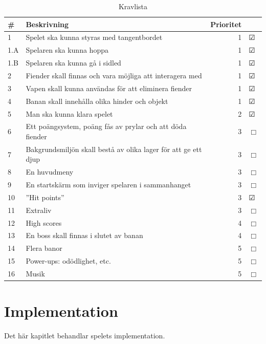 \documentclass{scrartcl}
\begin{document}
\begin{table}[ht]
	\caption{Kravlista}\label{kravlista}
	\centering
	\begin{tabular}{lp{8cm}rl}
	\toprule
		\# & Beskrivning & Prioritet &  \\
	\midrule
	1 & Spelet ska kunna styras med tangentbordet &
		1 & $\CheckedBox$ \\
	1.A & Spelaren ska kunna hoppa &
		1 & $\CheckedBox$ \\
	1.B & Spelaren ska kunna gå i sidled &
		1 & $\CheckedBox$ \\
	2 & Fiender skall finnas och vara möjliga att interagera med &
		1 & $\CheckedBox$ \\
	3 & Vapen skall kunna användas för att eliminera fiender &
		1 & $\CheckedBox$ \\
	4 & Banan skall innehålla olika hinder och objekt  &
		1 & $\CheckedBox$ \\
	5 & Man ska kunna klara spelet &
		2 & $\CheckedBox$ \\
	6 & Ett poängsystem, poäng fås av prylar och att döda fiender &
		3 & $\Box$ \\
	7 & Bakgrundsmiljön skall bestå av olika lager för att ge ett djup &
		3 & $\Box$ \\
	8 & En huvudmeny &
		3 & $\Box$ \\
	9 & En startskärm som inviger spelaren i sammanhanget &
		3 & $\Box$ \\
	10 & ”Hit points” &
		3 & $\CheckedBox$ \\
	11 & Extraliv &
		3 & $\Box$ \\
	12 & High scores &
		4 & $\Box$ \\
	13 & En boss skall finnas i slutet av banan &
		4 & $\Box$ \\
	14 & Flera banor &
		5 & $\Box$ \\
	15 & Power-ups: odödlighet, etc. &
		5 & $\Box$ \\
	16 & Musik &
		5 & $\Box$ \\

	\bottomrule
	\end{tabular}
\end{table}

\section{Implementation}
Det här kapitlet behandlar spelets implementation.
\end{document}
